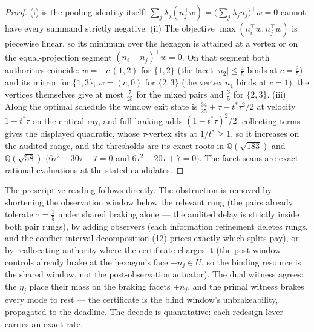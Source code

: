 \documentclass[10pt,twocolumn]{article}
\theoremstyle{plain}
\theoremstyle{definition}
\theoremstyle{remark}
\begin{document}
\begin{proof}
(i) is the pooling identity itself: \(\sum_j \lambda_j
(n_j^\top w) = \bigl(\sum_j \lambda_j n_j\bigr)^\top w = 0\)
cannot have every summand strictly negative. (ii) The objective
\(\max(n_i^\top w, n_j^\top w)\) is piecewise linear, so its
minimum over the hexagon is attained at a vertex or on the
equal-projection segment \((n_i - n_j)^\top w = 0\). On that segment
both authorities coincide: \(w = -c\,(1,2)\) for \(\{1,2\}\) (the
facet \(|u_2| \le \tfrac45\) binds at \(c = \tfrac25\)) and its
mirror for \(\{1,3\}\); \(w = (c, 0)\) for \(\{2,3\}\) (the
vertex \(n_1\) binds at \(c = 1\)); the vertices themselves give at
most \(\tfrac7{25}\) for the mixed pairs and \(\tfrac35\) for
\(\{2,3\}\). (iii) Along the optimal schedule the window exit state is
\(\tfrac{34}{25} + \tau - t^{*}\tau^2/2\) at velocity
\(1 - t^{*}\tau\) on the critical ray, and full braking adds
\((1 - t^{*}\tau)^2/2\); collecting terms gives the displayed
quadratic, whose \(\tau\)-vertex sits at \(1/t^{*} \ge 1\), so it
increases on the audited range, and the thresholds are its exact roots
in \(\mathbb{Q}(\sqrt{183})\) and \(\mathbb{Q}(\sqrt{58})\)
\(\bigl(6\tau^2 - 30\tau + 7 = 0\) and \(6\tau^2 - 20\tau + 7 =
0\bigr)\). The facet scans are exact rational evaluations at the stated
candidates.
\end{proof}

The prescriptive reading follows directly. The obstruction is removed by
shortening the observation window below the relevant rung (the pairs
already tolerate \(\tau = \tfrac15\) under shared braking alone ---
the audited delay is strictly inside both pair rungs), by adding
observers (each information refinement deletes rungs, and the
conflict-interval decomposition (12) prices exactly which splits pay), or
by reallocating authority where the certificate charges it (the post-window
controls already brake at the hexagon's face \(-n_j \in U\), so the
binding resource is the shared window, not the post-observation actuator).
The dual witness agrees: the \(\eta_j\) place their mass on the braking
facets \(\mp n_j\), and the primal witness brakes every mode to rest ---
the certificate is the blind window's unbrakeability, propagated to the
deadline. The decode is quantitative: each redesign lever carries an exact
rate.
\end{document}
